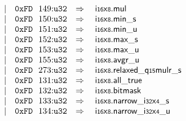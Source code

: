 $$\begin{array}[t]{@{}lrrl@{}l@{}l@{}l@{}}
& & | & \mathtt{0xFD}~~149{:}{\mathtt{u32}} & \quad\Rightarrow\quad{} & {\mathsf{i{\scriptstyle 16}}}{\mathsf{x}}{\mathsf{{\scriptstyle 8}}} {.} \mathsf{mul} \\
& & | & \mathtt{0xFD}~~150{:}{\mathtt{u32}} & \quad\Rightarrow\quad{} & {\mathsf{i{\scriptstyle 16}}}{\mathsf{x}}{\mathsf{{\scriptstyle 8}}} {.} {\mathsf{min}}{\mathsf{\_}}{\mathsf{s}} \\
& & | & \mathtt{0xFD}~~151{:}{\mathtt{u32}} & \quad\Rightarrow\quad{} & {\mathsf{i{\scriptstyle 16}}}{\mathsf{x}}{\mathsf{{\scriptstyle 8}}} {.} {\mathsf{min}}{\mathsf{\_}}{\mathsf{u}} \\
& & | & \mathtt{0xFD}~~152{:}{\mathtt{u32}} & \quad\Rightarrow\quad{} & {\mathsf{i{\scriptstyle 16}}}{\mathsf{x}}{\mathsf{{\scriptstyle 8}}} {.} {\mathsf{max}}{\mathsf{\_}}{\mathsf{s}} \\
& & | & \mathtt{0xFD}~~153{:}{\mathtt{u32}} & \quad\Rightarrow\quad{} & {\mathsf{i{\scriptstyle 16}}}{\mathsf{x}}{\mathsf{{\scriptstyle 8}}} {.} {\mathsf{max}}{\mathsf{\_}}{\mathsf{u}} \\
& & | & \mathtt{0xFD}~~155{:}{\mathtt{u32}} & \quad\Rightarrow\quad{} & {\mathsf{i{\scriptstyle 16}}}{\mathsf{x}}{\mathsf{{\scriptstyle 8}}} {.} {\mathsf{avgr}}{\mathsf{\_}}{\mathsf{u}} \\
& & | & \mathtt{0xFD}~~273{:}{\mathtt{u32}} & \quad\Rightarrow\quad{} & {\mathsf{i{\scriptstyle 16}}}{\mathsf{x}}{\mathsf{{\scriptstyle 8}}} {.} {\mathsf{relaxed\_q{\scriptstyle 15}mulr}}{\mathsf{\_}}{\mathsf{s}} \\
& & | & \mathtt{0xFD}~~131{:}{\mathtt{u32}} & \quad\Rightarrow\quad{} & {\mathsf{i{\scriptstyle 16}}}{\mathsf{x}}{\mathsf{{\scriptstyle 8}}} {.} \mathsf{all\_true} \\
& & | & \mathtt{0xFD}~~132{:}{\mathtt{u32}} & \quad\Rightarrow\quad{} & {\mathsf{i{\scriptstyle 16}}}{\mathsf{x}}{\mathsf{{\scriptstyle 8}}}{.}\mathsf{bitmask} \\
& & | & \mathtt{0xFD}~~133{:}{\mathtt{u32}} & \quad\Rightarrow\quad{} & {{\mathsf{i{\scriptstyle 16}}}{\mathsf{x}}{\mathsf{{\scriptstyle 8}}}{.}\mathsf{narrow}}{\mathsf{\_}}{{\mathsf{i{\scriptstyle 32}}}{\mathsf{x}}{\mathsf{{\scriptstyle 4}}}}{\mathsf{\_}}{\mathsf{s}} \\
& & | & \mathtt{0xFD}~~134{:}{\mathtt{u32}} & \quad\Rightarrow\quad{} & {{\mathsf{i{\scriptstyle 16}}}{\mathsf{x}}{\mathsf{{\scriptstyle 8}}}{.}\mathsf{narrow}}{\mathsf{\_}}{{\mathsf{i{\scriptstyle 32}}}{\mathsf{x}}{\mathsf{{\scriptstyle 4}}}}{\mathsf{\_}}{\mathsf{u}} \\

\end{array}$$
